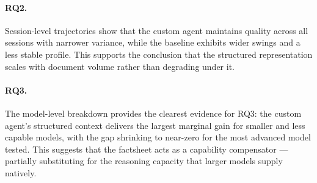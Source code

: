 \paragraph{RQ2.}
Session-level trajectories show that the custom agent maintains quality across all
sessions with narrower variance, while the baseline exhibits wider swings and a less
stable profile. This supports the conclusion that the structured representation scales
with document volume rather than degrading under it.

\paragraph{RQ3.}
The model-level breakdown provides the clearest evidence for RQ3: the custom agent's
structured context delivers the largest marginal gain for smaller and less capable
models, with the gap shrinking to near-zero for the most advanced model tested. This
suggests that the factsheet acts as a capability compensator --- partially substituting
for the reasoning capacity that larger models supply natively.
